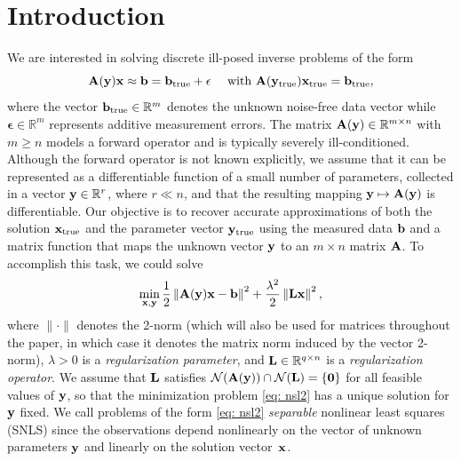 \documentclass[onefignum,onetabnum]{siamart171218}
\newcommand{\bA}{{\bf A}}
\newcommand{\bL}{{\bf L}}
\newcommand{\bb}{{\bf b}}
\newcommand{\bx}{{\bf x}}
\newcommand{\by}{{\bf y}}
\begin{document}
\section{Introduction} We %
are interested in solving discrete ill-posed inverse problems of the %
form 
\begin{equation*}
\bA(\by)\bx  \approx \bb =  \bb_{\rm true} + \mathbf{\epsilon} \quad \mbox{ with } \bA( \by_{\rm true}) \bx_{\rm true} = \bb_{\rm true},
\end{equation*}
where %
the vector $\bb_{\rm true} \in \mathbb{R}^m$ denotes the unknown noise-free data vector while $\mathbf{\epsilon} \in \mathbb{R}^m$ represents additive measurement errors. The matrix $\bA(\by) \in \mathbb{R}^{m\times n}$ with $m\geq n$ models a forward operator and is typically severely ill-conditioned. Although the forward operator is not known explicitly, we assume that it can be represented as a differentiable function of a small number of parameters, collected in a vector $\by \in \mathbb{R}^r$, where $r \ll n$, and that the resulting mapping $\by \mapsto \bA(\by)$ is differentiable. Our objective is to recover accurate approximations of both the solution $\bx_{\rm true}$ and the parameter vector $\by_{\rm true}$ using the measured data $\bb$ and a matrix function that maps the unknown vector $\by$ to an $m \times n$ matrix $\bA$. To accomplish this task, we could solve
\begin{equation}\label{eq: nsl2}
\min_{\bx, \by} \frac{1}{2}\left\|\bA(\by)\bx - \bb \right\|^2 + \frac{\lambda^2}{2} \left\|\bL \bx\right\|^2,
\end{equation}
where $\|\cdot\|$ denotes the 2-norm (which will also be used for matrices throughout the paper, in which case it denotes the matrix norm induced by the vector 2-norm), $\lambda>0$ is a \emph{regularization parameter}, and $\bL \in \mathbb{R}^{q\times n}$ is a \emph{regularization operator}. We assume that $\bL$ satisfies $\mathcal{N}(\bA(\by)) \cap \mathcal{N} (\bL) = \{\boldsymbol{0}\}$ for all feasible values of $\by$, so that the minimization problem \eqref{eq: nsl2} has a unique solution for $\by$ fixed. We call %
problems of %
the form \eqref{eq: nsl2}  \emph{separable} nonlinear least squares (SNLS) since the observations depend nonlinearly on the vector of unknown parameters $\by$ and linearly on the solution vector~$\bx$. 
\end{document}
